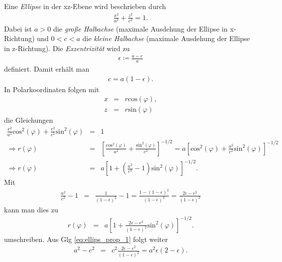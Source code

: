 \documentclass{book}
\renewcommand{\sin}{\text{sin}}
\renewcommand{\cos}{\text{cos}}
\begin{document}
Eine \textit{Ellipse} in der xz-Ebene wird beschrieben durch
%
\begin{eqnarray}
\frac{x^2}{a^2} + \frac{z^2}{c^2} = 1.
\end{eqnarray}
%
Dabei ist $a > 0$ die \textit{große Halbachse} (maximale Ausdehung der Ellipse in x-Richtung) und $0 < c < a$ die \textit{kleine Halbachse} (maximale Ausdehung der Ellipse in z-Richtung). Die \textit{Exzentrizität} wird zu
%
\begin{eqnarray}
\epsilon \coloneqq \frac{a - c}{a}
\end{eqnarray}
%
definiert. Damit erhält man
%
\begin{eqnarray}
c = a\left(1 - \epsilon\right).
\end{eqnarray}
%
In Polarkoordinaten folgen mit
%
\begin{eqnarray}
x & = & r\cos\left(\varphi\right),\\
z & = & r\sin\left(\varphi\right)
\end{eqnarray}
%
die Gleichungen
%
\begin{eqnarray}
\frac{r^2}{a^2}\cos^2\left(\varphi\right) + \frac{r^2}{c^2}\sin^2\left(\varphi\right) & = & 1\nonumber\\
\Rightarrow r\left(\varphi\right) & = & \left[\frac{\cos^2\left(\varphi\right)}{a^2} + \frac{\sin^2\left(\varphi\right)}{c^2}\right]^{-1/2} = a\left[\cos^2\left(\varphi\right) + \frac{a^2}{c^2}\sin^2\left(\varphi\right)\right]^{-1/2}\nonumber\\
\Rightarrow r\left(\varphi\right) & = & a\left[1 + \left(\frac{a^2}{c^2} - 1\right)\sin^2\left(\varphi\right)\right]^{-1/2}.
\end{eqnarray}
%
Mit
%
\begin{eqnarray}
\frac{a^2}{c^2} - 1 & = & \frac{1}{\left(1 - \epsilon\right)^2} - 1 = \frac{1 - \left(1 - \epsilon\right)^2}{\left(1 - \epsilon\right)^2} = \frac{2\epsilon - \epsilon^2}{\left(1 - \epsilon\right)^2}\label{eq:ellips_prop_1}
\end{eqnarray}
%
kann man dies zu
%
\begin{eqnarray}
r\left(\varphi\right) & = & a\left[1 + \frac{2\epsilon - \epsilon^2}{\left(1 - \epsilon\right)^2}\sin^2\left(\varphi\right)\right]^{-1/2}.
\end{eqnarray}
%
umschreiben. Aus Glg \eqref{eq:ellips_prop_1} folgt weiter
%
\begin{eqnarray}
a^2 - c^2 & = & c^2\frac{2\epsilon - \epsilon^2}{\left(1 - \epsilon\right)^2} = a^2\epsilon\left(2 - \epsilon\right)\label{eq:ellips_prop_2}.
\end{eqnarray}
\end{document}
